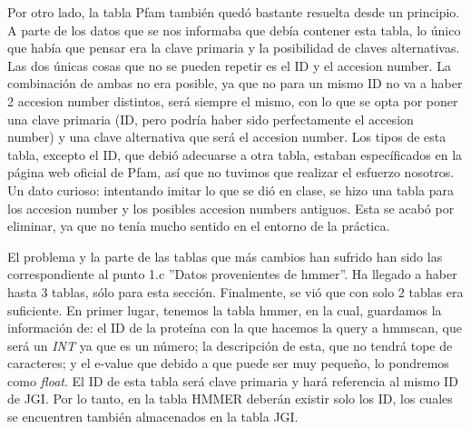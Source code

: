 \documentclass[11pt]{article} %
\begin{document}
Por otro lado, la tabla Pfam tambi\'en qued\'o bastante resuelta desde un principio. A parte de los datos que se nos informaba que deb\'ia contener esta tabla, lo \'unico que hab\'ia que pensar era la clave primaria y la posibilidad de claves alternativas. Las dos \'unicas cosas que no se pueden repetir es el ID y el accesion number. La combinaci\'on de ambas no era posible, ya que no para un mismo ID no va a haber 2 accesion number distintos, ser\'a siempre el mismo, con lo que se opta por poner una clave primaria (ID, pero podr\'ia haber sido perfectamente el accesion number) y una clave alternativa que ser\'a el accesion number. Los tipos de esta tabla, excepto el ID, que debi\'o adecuarse a otra tabla, estaban espec\'ificados en la p\'agina web oficial de Pfam, as\'i que no tuvimos que realizar el esfuerzo nosotros. Un dato curioso: intentando imitar lo que se di\'o en clase, se hizo una tabla para los accesion number y los posibles accesion numbers antiguos. Esta se acab\'o por eliminar, ya que no ten\'ia mucho sentido en el entorno de la pr\'actica.

El problema y la parte de las tablas que m\'as cambios han sufrido han sido las  correspondiente al punto 1.c ''Datos provenientes de hmmer''. Ha llegado a haber hasta 3 tablas, s\'olo para esta secci\'on. Finalmente, se vi\'o que con solo 2 tablas era suficiente. En primer lugar, tenemos la tabla hmmer, en la cual, guardamos la informaci\'on de: el ID de la prote\'ina con la que hacemos la query a hmmscan, que ser\'a un \emph{INT} ya que es un n\'umero; la descripci\'on de esta, que no tendr\'a  tope de caracteres; y el e-value que debido a que puede ser muy peque\~no, lo pondremos como \emph{float}. El ID de esta tabla ser\'a clave primaria y har\'a referencia al mismo ID de JGI. Por lo tanto, en la tabla HMMER deber\'an existir solo los ID, los cuales se encuentren tambi\'en almacenados en la tabla JGI. 
\end{document}
